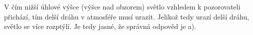 \documentclass{../../../../style/mkimain}
\begin{document}
\noindent{}
\proborigin{}
\klein
V čím nižší úhlové výšce (výšce nad obzorem) světlo vzhledem k pozorovateli přichází, tím delší dráhu v atmosféře musí urazit.
Jelikož tedy urazí delší dráhu, světlo se více rozptýlí. Je tedy jasné, že správná odpověd je a).
\end{document}
